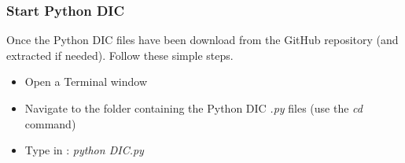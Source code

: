 \subsubsection{Start Python DIC}
\label{subs:Start Python DIC}
  \indent\indent Once the Python DIC files have been download from the GitHub repository (and extracted if needed). Follow these simple steps.
  \begin{itemize}
    \item Open a Terminal window
    \item Navigate to the folder containing the Python DIC \textit{.py} files (use the \textit{cd} command)
    \item Type in : \textit{python DIC.py}
  \end{itemize}
